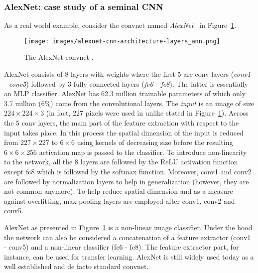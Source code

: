 \documentclass[12pt,a4paper]{article}
\begin{document}
\subsubsection{AlexNet: case study of a seminal CNN}\label{subsubsec:alexnet}
As a real world example, consider the convnet named \textit{AlexNet}~\cite{AlexNet} in Figure~\ref{fig:AlexNet}.
\begin{figure}[ht]
\centering
\texttt{[image: images/alexnet-cnn-architecture-layers\_ann.png]}
\caption{The AlexNet convnet \cite{AlexNet}.}
\label{fig:AlexNet}
\end{figure}
AlexNet consists of 8 layers with weights where the first 5 are conv layers (\textit{conv1 - conv5}) followed by 3 fully connected layers (\textit{fc6 - fc8}). The latter is essentially an MLP classifier. AlexNet has 62.3 million trainable parameters of which only 3.7 million (6\%) come from the convolutional layers. The \textit{input} is an image of size $224 \times 224 \times 3$ (in fact, 227 pixels were used in \cite{AlexNet} unlike stated in Figure~\ref{fig:AlexNet}). Across the 5 conv layers, the main part of the feature extraction with respect to the input takes place. In this process the spatial dimension of the input is reduced from $227 \times 227$ to $6 \times 6$ using kernels of decreasing size before the resulting $6 \times 6 \times 256$ activation map is passed to the classifier. To introduce non-linearity to the network, all the 8 layers are followed by the ReLU activation function except fc8 which is followed by the softmax function. Moreover, conv1 and conv2 are followed by normalization layers to help in generalization (however, they are not common anymore). To help reduce spatial dimension and as a measure against overfitting, max-pooling layers are employed after conv1, conv2 and conv5. 

AlexNet as presented in Figure~\ref{fig:AlexNet} is a non-linear image classifier. Under the hood the network can also be considered a concatenation of a feature extractor (conv1 - conv5) and a non-linear classifier (fc6 - fc8). The feature extractor part, for instance, can be used for transfer learning. AlexNet is still widely used today as a well established and de facto standard convnet.
\end{document}
